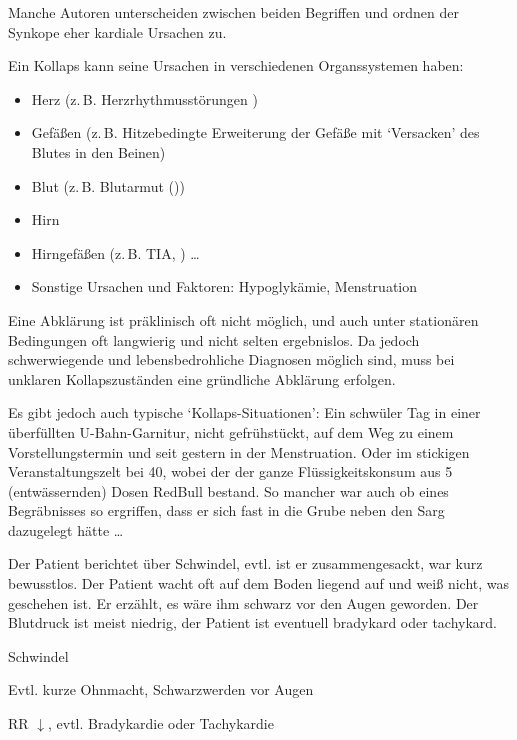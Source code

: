 {%
Manche Autoren unterscheiden zwischen beiden Begriffen und 
ordnen der Synkope eher kardiale Ursachen zu. 

Ein Kollaps kann seine Ursachen in verschiedenen
Organssystemen haben:
\begin{itemize}
  \item Herz (z.\,B. Herzrhythmusstörungen )
  \item Gefäßen (z.\,B. Hitzebedingte Erweiterung
  der Gefäße mit \enquote*{Versacken} des Blutes in den
  Beinen)
  \item Blut (z.\,B. Blutarmut ())
  \item Hirn
  \item Hirngefäßen (z.\,B. TIA,
   ) \ldots
  \item Sonstige Ursachen und Faktoren: Hypoglykämie, 
  Menstruation
\end{itemize}

Eine Abklärung ist präklinisch oft nicht möglich, und auch
unter stationären Bedingungen oft langwierig und nicht
selten ergebnislos. Da jedoch schwerwiegende und
lebensbedrohliche Diagnosen möglich sind, muss bei unklaren
Kollapszuständen eine gründliche Abklärung erfolgen.

Es gibt jedoch auch typische \enquote*{Kollaps-Situationen}:
Ein schwüler Tag in einer überfüllten U-Bahn-Garnitur, nicht
gefrühstückt, auf dem Weg zu einem Vorstellungstermin und
seit gestern in der Menstruation. Oder im stickigen
Veranstaltungszelt bei 40\Deg , wobei der der ganze
Flüssigkeitskonsum aus 5 (entwässernden) Dosen
RedBull{\texttrademark}
bestand. So mancher war auch ob eines Begräbnisses so
ergriffen, dass er sich fast in die Grube neben den Sarg
dazugelegt hätte \ldots 
}{%

}{}{}{}


\TextSlide{\TxSymptome}
{%
Der Patient berichtet über Schwindel, evtl. ist er
zusammengesackt, war kurz bewusstlos. Der Patient wacht oft
auf dem Boden liegend auf und weiß nicht, was geschehen ist.
Er erzählt, es wäre ihm schwarz vor den Augen geworden. Der
Blutdruck ist meist niedrig, der Patient ist eventuell
bradykard oder tachykard.\bigskip
}{
\begin{compactitem}
  \item Schwindel
  \item Evtl. kurze Ohnmacht, Schwarzwerden vor Augen
  \item RR ${\downarrow}$, evtl. Bradykardie oder Tachykardie
\end{compactitem}
}{}{}{}





